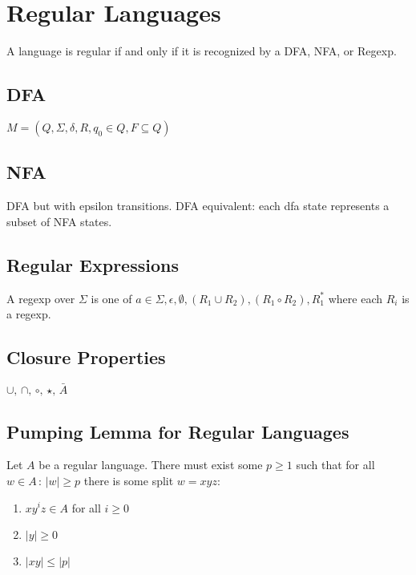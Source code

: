 

\section{Regular Languages}
\label{regularlanguages}

A language is regular if and only if it is recognized by a DFA, NFA, or Regexp.

\subsection{DFA}
\label{dfa}

$M = (Q, \Sigma, \delta, R, q_0 \in Q, F \subseteq Q)$

\subsection{NFA}
\label{nfa}

DFA but with epsilon transitions. DFA equivalent: each dfa state represents a subset of NFA states.

\subsection{Regular Expressions}
\label{regularexpressions}

A regexp over $\Sigma$ is one of $a\in \Sigma,\epsilon,\emptyset,(R_1\cup R_2),(R_1\circ R_2),R_1^* $ where each $R_i$ is a regexp.

\subsection{Closure Properties}
\label{closureproperties}

$\cup,\,\cap,\, \circ,\, \star,\, \bar{A}$

\subsection{Pumping Lemma for Regular Languages}
\label{pumpinglemmaforregularlanguages}

Let $A$ be a regular language. There must exist some $p \geq 1 $ such that for all $w\in A\, :\, |w| \geq p$ there is some split $w = xyz$:

\begin{enumerate}
\item $xy^iz \in A$ for all $i \geq 0$

\item $|y| \geq 0$

\item $|xy| \leq |p|$

\end{enumerate}

